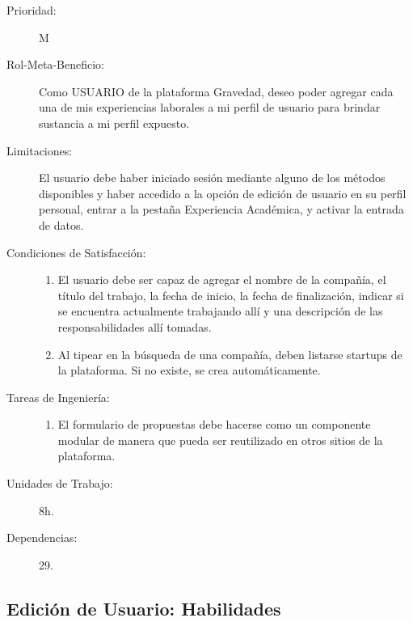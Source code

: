 \begin{description}
    \item[Prioridad:] M
    \item[Rol-Meta-Beneficio:] Como USUARIO de la plataforma Gravedad, deseo poder agregar cada una de mis experiencias laborales a mi perfil de usuario para brindar sustancia a mi perfil expuesto.
    \item[Limitaciones:] El usuario debe haber iniciado sesión mediante alguno de los métodos disponibles y haber accedido a la opción de edición de usuario en su perfil personal, entrar a la pestaña Experiencia Académica, y activar la entrada de datos.
    \item[Condiciones de Satisfacción:]  \hfill
        \begin{enumerate}
            \item El usuario debe ser capaz de agregar el nombre de la compañía, el título del trabajo, la fecha de inicio, la fecha de finalización, indicar si se encuentra actualmente trabajando allí y una descripción de las responsabilidades allí tomadas.
    		\item Al tipear en la búsqueda de una compañía, deben listarse startups de la plataforma. Si no existe, se  crea automáticamente.
        \end{enumerate}
    \item[Tareas de Ingeniería:]  \hfill
        \begin{enumerate}
            \item El formulario de propuestas debe hacerse como un componente modular de manera que pueda ser reutilizado en otros sitios de la plataforma.
        \end{enumerate}
    \item[Unidades de Trabajo:] 8h.
    \item[Dependencias:] 29.
\end{description}

\newpage


\subsection{Edición de Usuario: Habilidades}

